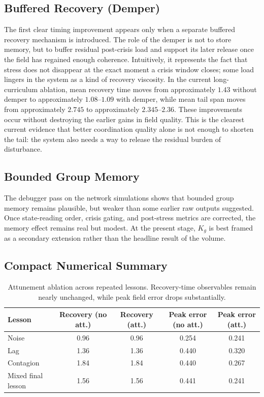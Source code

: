 \documentclass[12pt,a4paper]{article}
\begin{document}
\subsection{Buffered Recovery (Demper)}
The first clear timing improvement appears only when a separate buffered recovery mechanism is introduced. The role of the demper is not to store memory, but to buffer residual post-crisis load and support its later release once the field has regained enough coherence. Intuitively, it represents the fact that stress does not disappear at the exact moment a crisis window closes; some load lingers in the system as a kind of recovery viscosity. In the current long-curriculum ablation, mean recovery time moves from approximately $1.43$ without demper to approximately $1.08$--$1.09$ with demper, while mean tail span moves from approximately $2.745$ to approximately $2.345$--$2.36$. These improvements occur without destroying the earlier gains in field quality. This is the clearest current evidence that better coordination quality alone is not enough to shorten the tail: the system also needs a way to release the residual burden of disturbance.

\subsection{Bounded Group Memory}
The debugger pass on the network simulations shows that bounded group memory remains plausible, but weaker than some earlier raw outputs suggested. Once state-reading order, crisis gating, and post-stress metrics are corrected, the memory effect remains real but modest. At the present stage, $K_g$ is best framed as a secondary extension rather than the headline result of the volume.

\subsection{Compact Numerical Summary}
\begin{table}[H]
    \centering
    \begin{tabular}{lcccc}
        \toprule
        Lesson & Recovery (no att.) & Recovery (att.) & Peak error (no att.) & Peak error (att.) \\
        \midrule
        Noise & 0.96 & 0.96 & 0.254 & 0.241 \\
        Lag & 1.36 & 1.36 & 0.440 & 0.320 \\
        Contagion & 1.84 & 1.84 & 0.440 & 0.267 \\
        Mixed final lesson & 1.56 & 1.56 & 0.441 & 0.241 \\
        \bottomrule
    \end{tabular}
    \caption{Attunement ablation across repeated lessons. Recovery-time observables remain nearly unchanged, while peak field error drops substantially.}
    \label{tab:attunement_ablation}
\end{table}
\end{document}
